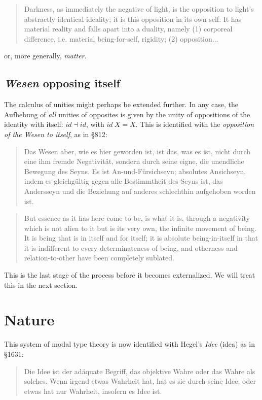 \documentclass{article}
\begin{document}
\begin{quote}
    Darkness, as immediately the negative of light, is the opposition to light’s abstractly identical ideality; it is this opposition in its own self. It has material reality and falls apart into a duality, namely (1) corporeal difference, i.e. material being-for-self, rigidity; (2) opposition...
\end{quote}

or, more generally, \emph{matter}.


\subsection{\emph{Wesen} opposing itself}
The calculus of unities might perhaps be extended further. In any case, the Aufhebung of \emph{all} unities of opposites is given by the unity of oppositions of the identity with itself: $id\dashv id$, with $id\ X=X$. This is identified with the \emph{opposition of the \emph{Wesen} to itself}, as in §812:

\begin{quote}
    Das Wesen aber, wie es hier geworden ist, ist das, was es ist, nicht durch eine ihm fremde Negativität, sondern durch seine eigne, die unendliche Bewegung des Seyns. Es ist An-und-Fürsichseyn; absolutes Ansichseyn, indem es gleichgültig gegen alle Bestimmtheit des Seyns ist, das Andersseyn und die Beziehung auf anderes schlechthin aufgehoben worden ist.
\end{quote}

\begin{quote}
    But essence as it has here come to be, is what it is, through a negativity which is not alien to it but is its very own, the infinite movement of being. It is being that is in itself and for itself; it is absolute being-in-itself in that it is indifferent to every determinateness of being, and otherness and relation-to-other have been completely sublated.
\end{quote}

This is the last stage of the process before it becomes externalized. We will treat this in the next section.


\section{Nature}
This system of modal type theory is now identified with Hegel's \emph{Idee} (idea) as in §1631:

\begin{quote}
    Die Idee ist der adäquate Begriff, das objektive Wahre oder das Wahre als solches. Wenn irgend etwas Wahrheit hat, hat es sie durch seine Idee, oder etwas hat nur Wahrheit, insofern es Idee ist.
\end{quote}
\end{document}
